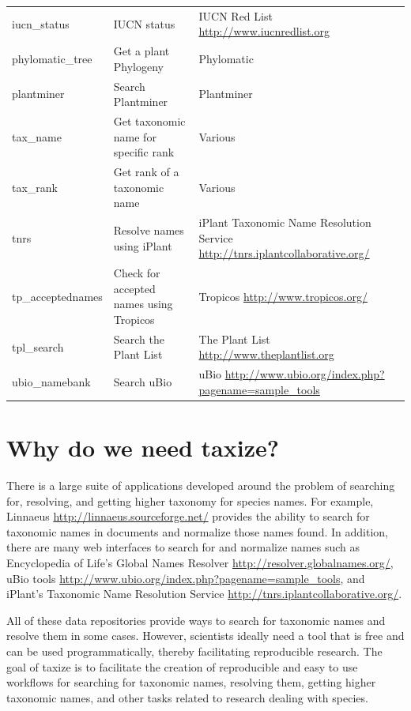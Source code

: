 \documentclass[10pt,a4paper,twocolumn]{article}
\begin{document}
\begin{table}[!ht]
\begin{tabular}{|l|L|L|}
iucn\_status & IUCN status & IUCN Red List \url{http://www.iucnredlist.org}  \\
phylomatic\_tree & Get a plant Phylogeny & Phylomatic \cite{webb2005}  \\
plantminer & Search Plantminer & Plantminer \cite{carvalho2010plantminer}   \\
tax\_name & Get taxonomic name for specific rank & Various  \\
tax\_rank & Get rank of a taxonomic name & Various  \\
tnrs & Resolve names using iPlant & iPlant Taxonomic Name Resolution Service \url{http://tnrs.iplantcollaborative.org/}  \\
tp\_acceptednames & Check for accepted names using Tropicos & Tropicos \url{http://www.tropicos.org/}  \\
tpl\_search & Search the Plant List & The Plant List \url{http://www.theplantlist.org}  \\
ubio\_namebank & Search uBio & uBio \url{http://www.ubio.org/index.php?pagename=sample_tools}  \\
\hline
\end{tabular}
\label{tab:a}
\end{table}


\section*{Why do we need taxize?}

There is a large suite of applications developed around the problem of searching for, resolving, and getting higher taxonomy for species names. For example, Linnaeus \url{http://linnaeus.sourceforge.net/} provides the ability to search for taxonomic names in documents and normalize those names found. In addition, there are many web interfaces to search for and normalize names such as Encyclopedia of Life's Global Names Resolver \url{http://resolver.globalnames.org/}, uBio tools \url{http://www.ubio.org/index.php?pagename=sample_tools}, and iPlant's Taxonomic Name Resolution Service \url{http://tnrs.iplantcollaborative.org/}. 

All of these data repositories provide ways to search for taxonomic names and resolve them in some cases. However, scientists ideally need a tool that is free and can be used programmatically, thereby facilitating reproducible research. The goal of taxize is to facilitate the creation of reproducible and easy to use workflows for searching for taxonomic names, resolving them, getting higher taxonomic names, and other tasks related to research dealing with species.
\end{document}
